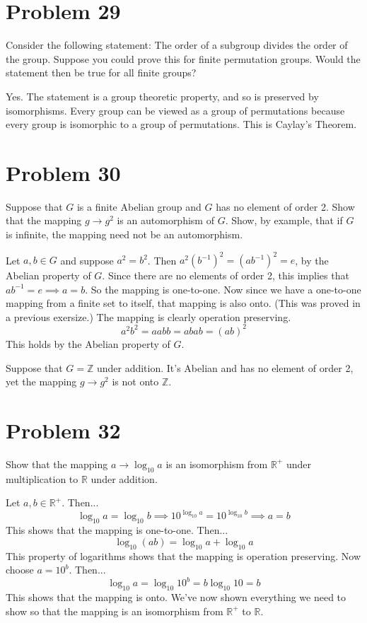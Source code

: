 \documentclass{article}
\begin{document}
\section*{Problem 29}

Consider the following statement: The order of a subgroup divides the
order of the group.  Suppose you could prove this for finite permutation groups.
Would the statement then be true for all finite groups?

Yes.  The statement is a group theoretic property, and so is preserved by isomorphisms.
Every group can be viewed as a group of permutations because every group is isomorphic
to a group of permutations.  This is Caylay's Theorem.

\section*{Problem 30}

Suppose that $G$ is a finite Abelian group and $G$ has no element of order
2.  Show that the mapping $g\to g^2$ is an automorphism of $G$.  Show, by
example, that if $G$ is infinite, the mapping need not be an automorphism.

Let $a,b\in G$ and suppose $a^2=b^2$.  Then $a^2(b^{-1})^2 = (ab^{-1})^2=e$, by
the Abelian property of $G$.
Since there are no elements of order 2, this implies that $ab^{-1}=e\implies a=b$.
So the mapping is one-to-one.
Now since we have a one-to-one mapping from a finite set to itself, that mapping is
also onto.  (This was proved in a previous exersize.)
The mapping is clearly operation preserving.
\begin{equation*}
a^2b^2 = aabb = abab = (ab)^2
\end{equation*}
This holds by the Abelian property of $G$.

Suppose that $G=\mathbb{Z}$ under addition.  It's Abelian and has no element
of order 2, yet the mapping $g\to g^2$ is not onto $\mathbb{Z}$.

\section*{Problem 32}

Show that the mapping $a\to\log_{10}a$ is an isomorphism from $\mathbb{R}^{+}$ under
multiplication to $\mathbb{R}$ under addition.

Let $a,b\in\mathbb{R}^{+}$.  Then...
\begin{equation*}
\log_{10}a = \log_{10}b\implies 10^{\log_{10}a}=10^{\log_{10}b}\implies a=b
\end{equation*}
This shows that the mapping is one-to-one.  Then...
\begin{equation*}
\log_{10}(ab) = \log_{10}a + \log_{10}a
\end{equation*}
This property of logarithms shows that the mapping is operation preserving.  Now
choose $a=10^b$.  Then...
\begin{equation*}
\log_{10}a = \log_{10}10^b = b\log_{10}10 = b
\end{equation*}
This shows that the mapping is onto.  We've now shown everything we need to show
so that the mapping is an isomorphism from $\mathbb{R}^{+}$ to $\mathbb{R}$.
\end{document}
